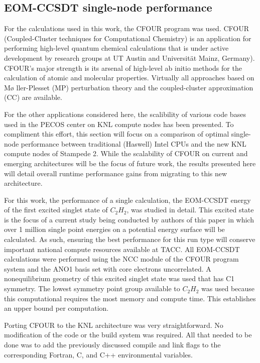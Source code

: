 \subsection{EOM-CCSDT single-node performance}
\label{sec:cfour}

For the calculations used in this work,
the CFOUR \cite{cfour:08} program was used. CFOUR
(Coupled-Cluster techniques for Computational Chemistry) is an
application for performing high-level quantum chemical calculations
that is under active development by research groups at UT Austin and
Universit\"{a}t Mainz, Germany). CFOUR's major strength is its arsenal
of high-level ab initio methods for the calculation of atomic and
molecular properties.  Virtually all approaches based on M\o
ller-Plesset (MP) perturbation theory and the coupled-cluster
approximation (CC) are available.

For the other applications considered here, the scalibility of various code bases 
used in the PECOS center on KNL compute nodes has been presented. To compliment
this effort, this section will focus on a comparison of optimal single-node performance
between traditional (Haswell) Intel CPUs and the new KNL compute nodes of Stampede 2.
While the scalability of CFOUR on current and emerging architectures will be the focus 
of future work, the results presented here will detail overall runtime performance gains
from migrating to this new architecture. 

For this work, the performance of a single calculation, the EOM-CCSDT energy of the first
excited singlet state of $C_2H_2$, was studied in detail. This excited state is the focus
of a current study being conducted by authors of this paper in which over 1 million single point
energies on a potential energy surface will be calculated. As such, ensuring the best performance for this run 
type will conserve important national compute resources available at TACC. All EOM-CCSDT calculations were performed 
using the NCC module \cite{ncc:15} of the CFOUR program system and the ANO1 basis set \cite{ano1:87} with core 
electrons uncorrelated. A nonequilibrium geometry of this excited singlet state was used that has C1 symmetry. 
The lowest symmetry point group available to $C_2H_2$ was used because this computational requires the most memory 
and compute time. This establishes an upper bound per computation.

Porting CFOUR to the KNL architecture was very straightforward. No modification of the code or the build
system was required. All that needed to be done was to add the previously discussed compile and link flags
to the corresponding Fortran, C, and C++ environmental variables.

